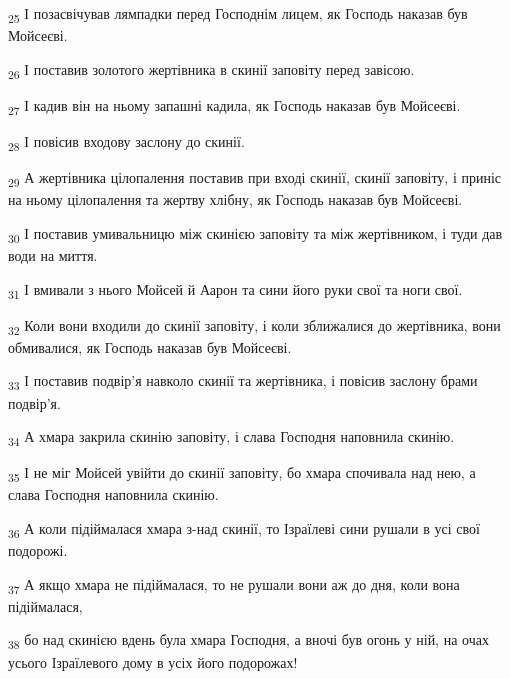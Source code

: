 \begin{tcolorbox}
\textsubscript{25} І позасвічував лямпадки перед Господнім лицем, як Господь наказав був Мойсеєві.
\end{tcolorbox}
\begin{tcolorbox}
\textsubscript{26} І поставив золотого жертівника в скинії заповіту перед завісою.
\end{tcolorbox}
\begin{tcolorbox}
\textsubscript{27} І кадив він на ньому запашні кадила, як Господь наказав був Мойсеєві.
\end{tcolorbox}
\begin{tcolorbox}
\textsubscript{28} І повісив входову заслону до скинії.
\end{tcolorbox}
\begin{tcolorbox}
\textsubscript{29} А жертівника цілопалення поставив при вході скинії, скинії заповіту, і приніс на ньому цілопалення та жертву хлібну, як Господь наказав був Мойсеєві.
\end{tcolorbox}
\begin{tcolorbox}
\textsubscript{30} І поставив умивальницю між скинією заповіту та між жертівником, і туди дав води на миття.
\end{tcolorbox}
\begin{tcolorbox}
\textsubscript{31} І вмивали з нього Мойсей й Аарон та сини його руки свої та ноги свої.
\end{tcolorbox}
\begin{tcolorbox}
\textsubscript{32} Коли вони входили до скинії заповіту, і коли зближалися до жертівника, вони обмивалися, як Господь наказав був Мойсеєві.
\end{tcolorbox}
\begin{tcolorbox}
\textsubscript{33} І поставив подвір'я навколо скинії та жертівника, і повісив заслону брами подвір'я.
\end{tcolorbox}
\begin{tcolorbox}
\textsubscript{34} А хмара закрила скинію заповіту, і слава Господня наповнила скинію.
\end{tcolorbox}
\begin{tcolorbox}
\textsubscript{35} І не міг Мойсей увійти до скинії заповіту, бо хмара спочивала над нею, а слава Господня наповнила скинію.
\end{tcolorbox}
\begin{tcolorbox}
\textsubscript{36} А коли підіймалася хмара з-над скинії, то Ізраїлеві сини рушали в усі свої подорожі.
\end{tcolorbox}
\begin{tcolorbox}
\textsubscript{37} А якщо хмара не підіймалася, то не рушали вони аж до дня, коли вона підіймалася,
\end{tcolorbox}
\begin{tcolorbox}
\textsubscript{38} бо над скинією вдень була хмара Господня, а вночі був огонь у ній, на очах усього Ізраїлевого дому в усіх його подорожах!
\end{tcolorbox}
